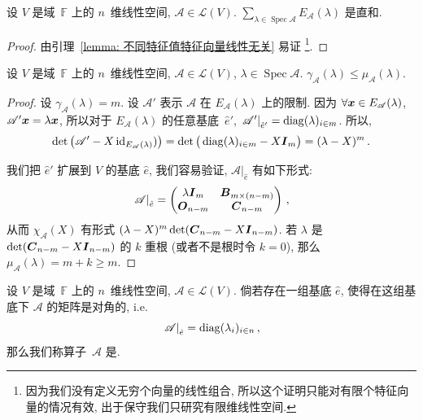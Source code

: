 \documentclass[openany, a5paper, oneside]{ctexbook}
\newcommand*{\inbasis}[2]{\left.%
	{#1}\right|_{#2}
}
\DeclareMathOperator{\Spec}{Spec}
\begin{document}
\begin{lemma}\label{lemma: 特征子空间之和是直和}
	设 $V$ 是域~$\mathbb F$ 上的 $n$~维线性空间, $\mathscr A \in \mathcal L(V)$. $\sum_{\lambda \in \Spec \mathscr A} E_\mathscr A(\lambda)$ 是直和.
\end{lemma}
\begin{proof}
	由引理~\ref{lemma: 不同特征值特征向量线性无关} 易证%
		\footnote{因为我们没有定义无穷个向量的线性组合, 所以这个证明只能对有限个特征向量的情况有效, 出于保守我们只研究有限维线性空间.}. 
\end{proof}

\begin{theorem}[几何重数不超过代数重数]\label{theorem: 几何重数不超过代数重数}
	设 $V$ 是域~$\mathbb F$ 上的 $n$~维线性空间, $\mathscr A \in \mathcal L(V)$,  $\lambda \in \Spec \mathscr A$. $\gamma_\mathscr A(\lambda) \leq \mu_\mathscr A (\lambda)$.
\end{theorem}
\begin{proof}
	设 $\gamma_\mathscr A(\lambda) = m$. 设 $\mathscr A'$ 表示 $\mathscr A$ 在 $E_\mathscr A(\lambda)$ 上的限制. 
	因为 $\forall \boldsymbol{x} \in E_\mathscr A(\lambda)$, $\mathscr A' \boldsymbol{x} = \lambda \boldsymbol{x}$, 所以对于 $E_\mathscr A(\lambda)$ 的任意基底~$\hat e'$, $\inbasis{\mathscr A'}{\hat e'} = \diag(\lambda)_{i \in m}$.
	所以, 
	\begin{equation*}
		\det \big(  \mathscr A' - X\operatorname{id}_{E_\mathscr A(\lambda)}) \big)
			= \det \big( \operatorname{diag}(\lambda)_{i \in m} - X \boldsymbol{I}_m\big)
			= (\lambda - X)^m \,.
	\end{equation*}

	我们把 $\hat e'$ 扩展到 $V$ 的基底 $\hat e$, 我们容易验证, $\inbasis{\mathscr A}{\hat e}$ 有如下形式:
	\begin{equation*}
		\inbasis{\mathscr A}{\hat e} = 
		\begin{pmatrix}
			\lambda \bv I_m & \bv B_{m \times (n - m)} \\
			\bv O_{n - m} & \bv C_{n - m}
		\end{pmatrix}\,, 
	\end{equation*}
	从而 $\chi_\mathscr A(X)$ 有形式 $(\lambda - X)^m \det (\boldsymbol{C}_{n - m} - X \boldsymbol{I}_{n - m})$. 
	若 $\lambda$ 是 $\det (\boldsymbol{C}_{n - m} - X \boldsymbol{I}_{n - m})$ 的 $k$ 重根 (或者不是根时令 $k = 0$), 那么 $\mu_\mathscr A(\lambda) = m + k \geq m$.
\end{proof}

\begin{definition}[可对角化]
	设 $V$ 是域~$\mathbb F$ 上的 $n$~维线性空间, $\mathscr A \in \mathcal L(V)$.
	倘若存在一组基底 $\hat e$, 使得在这组基底下 $\mathscr A$ 的矩阵是对角的, i.e.\ 
	\begin{equation*}
		\inbasis{\mathscr A}{\hat e} = \diag (\lambda_i)_{i \in n} \,,
	\end{equation*}
	那么我们称算子~$\mathscr A$ 是.
\end{definition}
\end{document}
